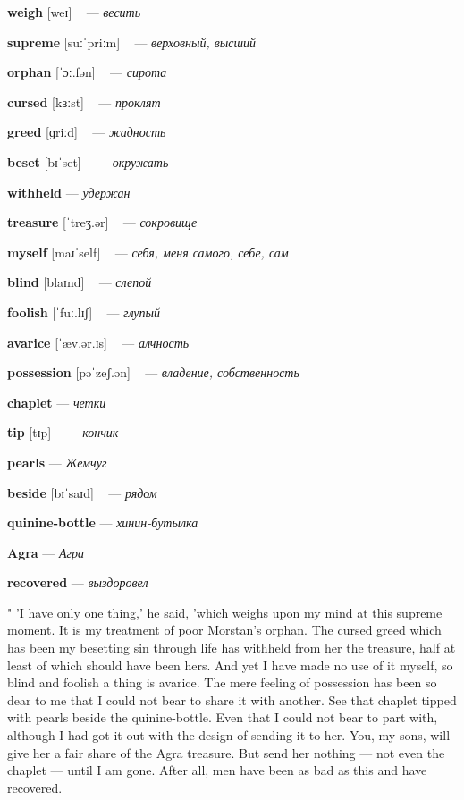 \documentclass[a4paper,oneside,12pt]{amsart}
\begin{document}
{\large 

 {\bf weigh } [weɪ] ~ --- \emph{ весить }

{\bf supreme } [suːˈpriːm] ~ --- \emph{ верховный, высший }

{\bf orphan } [ˈɔː.fən] ~ --- \emph{ сирота }

{\bf cursed } [kɜːst] ~ --- \emph{ проклят }

{\bf greed } [ɡriːd] ~ --- \emph{ жадность }

{\bf beset } [bɪˈset] ~ --- \emph{ окружать }

{\bf withheld } --- \emph{ удержан }

{\bf treasure } [ˈtreʒ.ər] ~ --- \emph{ сокровище }

{\bf myself } [maɪˈself] ~ --- \emph{ себя, меня самого, себе, сам }

{\bf blind } [blaɪnd] ~ --- \emph{ слепой }

{\bf foolish } [ˈfuː.lɪʃ] ~ --- \emph{ глупый }

{\bf avarice } [ˈæv.ər.ɪs] ~ --- \emph{ алчность }

{\bf possession } [pəˈzeʃ.ən] ~ --- \emph{ владение, собственность }

{\bf chaplet } --- \emph{ четки }

{\bf tip } [tɪp] ~ --- \emph{ кончик }

{\bf pearls } --- \emph{ Жемчуг }

{\bf beside } [bɪˈsaɪd] ~ --- \emph{ рядом }

{\bf quinine-bottle } --- \emph{ хинин-бутылка }

{\bf Agra } --- \emph{ Агра }

{\bf recovered } --- \emph{ выздоровел }

} \vspace{6mm} {\Large 

 
" 'I have only one thing,' he said, 'which weighs upon my mind at this supreme moment. It is my treatment of poor Morstan's orphan. The cursed greed which has been my besetting sin through life has withheld from her the treasure, half at least of which should have been hers. And yet I have made no use of it myself, so blind and foolish a thing is avarice. The mere feeling of possession has been so dear to me that I could not bear to share it with another. See that chaplet tipped with pearls beside the quinine-bottle. Even that I could not bear to part with, although I had got it out with the design of sending it to her. You, my sons, will give her a fair share of the Agra treasure. But send her nothing --- not even the chaplet --- until I am gone. After all, men have been as bad as this and have recovered.
\\ } 
\end{document}
